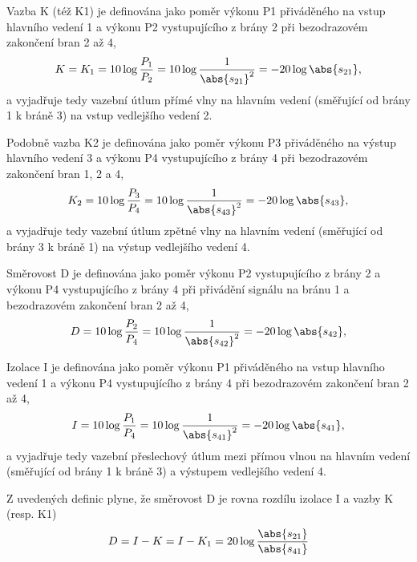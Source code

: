         Vazba K (též K1) je definována jako poměr výkonu P1 přiváděného na vstup hlavního vedení 1 
        a výkonu P2 vystupujícího z brány 2 při bezodrazovém zakončení bran 2 až 4,
        \begin{equation}\label{RA:eq_smith10}
          K = K_1 = 10\log\frac{P_1}{P_2} 
                  = 10\log\frac{1}{\abs{s_{21}}^2} = -20\log\abs{s_{21}},  
        \end{equation} 
        a vyjadřuje tedy vazební útlum přímé vlny na hlavním vedení (směřující od brány 1 k bráně 
        3) na vstup vedlejšího vedení 2.
  
        Podobně vazba K2 je definována jako poměr výkonu P3 přiváděného na výstup hlavního vedení 3 
        a výkonu P4 vystupujícího z brány 4 při bezodrazovém zakončení bran 1, 2 a 4,
        \begin{equation}\label{RA:eq_smith11}
          K_2 = 10\log\frac{P_3}{P_4} 
              = 10\log\frac{1}{\abs{s_{43}}^2} = -20\log\abs{s_{43}},  
        \end{equation} 
        a vyjadřuje tedy vazební útlum zpětné vlny na hlavním vedení (směřující od brány 3 k bráně 
        1) na výstup vedlejšího vedení 4.
  
        Směrovost D je definována jako poměr výkonu P2 vystupujícího z brány 2 a výkonu P4 
        vystupujícího z brány 4 při přivádění signálu na bránu 1 a bezodrazovém zakončení bran 2 až 
        4,
        \begin{equation}\label{RA:eq_smith12}
          D = 10\log\frac{P_2}{P_4} 
            = 10\log\frac{1}{\abs{s_{42}}^2} = -20\log\abs{s_{42}},  
        \end{equation} 
  
        Izolace I je definována jako poměr výkonu P1 přiváděného na vstup hlavního vedení 1 a 
        výkonu P4 vystupujícího z brány 4 při bezodrazovém zakončení bran 2 až 4,
        \begin{equation}\label{RA:eq_smith13}
          I = 10\log\frac{P_1}{P_4} 
            = 10\log\frac{1}{\abs{s_{41}}^2} = -20\log\abs{s_{41}}, 
        \end{equation} 
        a vyjadřuje tedy vazební přeslechový útlum mezi přímou vlnou na hlavním vedení (směřující 
        od brány 1 k bráně 3) a výstupem vedlejšího vedení 4.
  
        Z uvedených definic plyne, že směrovost D je rovna rozdílu izolace I a vazby K (resp. K1)
        \begin{equation}\label{RA:eq_smith14}
          D = I - K = I - K_1 = 20\log\frac{\abs{s_{21}}}{\abs{s_{41}}}
        \end{equation}  
  
